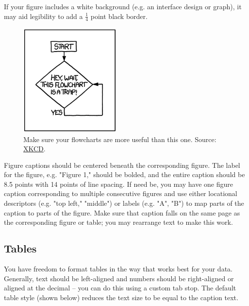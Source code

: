 \documentclass[11pt,a4paper,usenames,dvipsnames]{article}
\begin{document}
If your figure includes a white background (e.g. an interface design or graph), it may aid legibility to add a $\frac{1}{4}$ point black border.
\begin{figure}[H]
\centering
\includegraphics[width=0.45\textwidth]{xkcd.png}
\caption{\label{fig:xkcd} Make sure your flowcharts are more useful than this one. Source: \href{https://xkcd.com/1195/}{XKCD}.}
\end{figure}

Figure captions should be centered beneath the corresponding figure. The label for the figure, e.g. "Figure 1," should be bolded, and the entire caption should be 8.5 points with 14 points of line spacing. If need be, you may have one figure caption corresponding to multiple consecutive figures and use either locational descriptors (e.g. "top left," "middle") or labels (e.g. "A", "B") to map parts of the caption to parts of the figure. Make sure that caption falls on the same page as the corresponding figure or table; you may rearrange text to make this work.

\subsection{Tables}

You have freedom to format tables in the way that works best for your data. Generally, text should be left-aligned and numbers should be right-aligned or aligned at the decimal – you can do this using a custom tab stop. The default table style (shown below) reduces the text size to be equal to the caption text.
\end{document}
